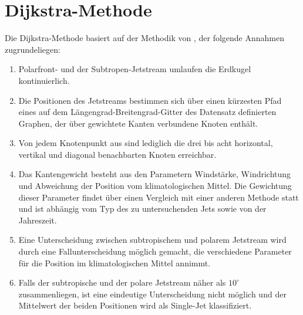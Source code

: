 
\section{Dijkstra-Methode}
Die Dijkstra-Methode basiert auf der Methodik von \citet{molnos-2017}, der folgende Annahmen zugrundeliegen:
\begin{enumerate}
  \item Polarfront- und der Subtropen-Jetstream umlaufen die Erdkugel kontinuierlich.
  \item Die Positionen des Jetstreams bestimmen sich über einen kürzesten Pfad eines auf dem Längengrad-Breitengrad-Gitter des Datensatz definierten Graphen, der über gewichtete Kanten verbundene Knoten enthält.
  \item Von jedem Knotenpunkt aus sind lediglich die drei bis acht horizontal, vertikal und diagonal benachbarten Knoten erreichbar.
  \item Das Kantengewicht besteht aus den Parametern Windstärke, Windrichtung und Abweichung der Position vom klimatologischen Mittel. Die Gewichtung dieser Parameter findet über einen Vergleich mit einer anderen Methode statt und ist abhängig vom Typ des zu untersuchenden Jets sowie von der Jahreszeit.
  \item Eine Unterscheidung zwischen subtropischem und polarem Jetstream wird durch eine Fallunterscheidung möglich gemacht, die verschiedene Parameter für die Position im klimatologischen Mittel annimmt.
  \item Falls der subtropische und der polare Jetstream näher als $10^\circ$ zusammenliegen, ist eine eindeutige Unterscheidung nicht möglich und der Mittelwert der beiden Positionen wird als Single-Jet klassifiziert.
\end{enumerate}
